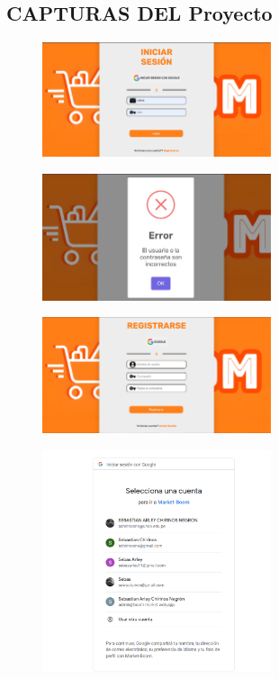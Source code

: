 \documentclass{article}
\begin{document}
	\subsection{CAPTURAS DEL Proyecto}
	\begin{figure}[H]
		\centering
		\includegraphics[width=0.6\textwidth,keepaspectratio]{img/1.png}
	\end{figure}
	\begin{figure}[H]
		\centering
		\includegraphics[width=0.6\textwidth,keepaspectratio]{img/2.png}
	\end{figure}
	\begin{figure}[H]
		\centering
		\includegraphics[width=0.6\textwidth,keepaspectratio]{img/3.png}
	\end{figure}
	\begin{figure}[H]
		\centering
		\includegraphics[width=0.6\textwidth,keepaspectratio]{img/4.png}
	\end{figure}
\end{document}
